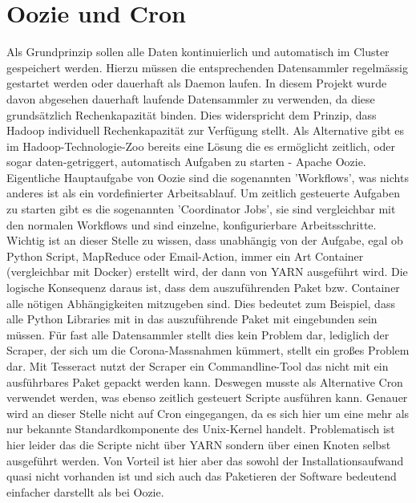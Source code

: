 \documentclass[12pt,oneside,a4paper,parskip]{scrbook}
\begin{document}
\section{Oozie und Cron}  \label{ooziecron}
Als Grundprinzip sollen alle Daten kontinuierlich und automatisch im Cluster gespeichert werden. Hierzu m\"ussen die entsprechenden Datensammler regelm\"assig gestartet werden oder dauerhaft als Daemon laufen. In diesem Projekt wurde davon abgesehen dauerhaft laufende Datensammler zu verwenden, da diese grunds\"atzlich Rechenkapazit\"at binden. Dies widerspricht dem Prinzip, dass Hadoop individuell Rechenkapazit\"at zur Verf\"ugung stellt.\newline
Als Alternative gibt es im Hadoop-Technologie-Zoo bereits eine L\"osung die es erm\"oglicht zeitlich, oder sogar daten-getriggert, automatisch Aufgaben zu starten - Apache Oozie. Eigentliche Hauptaufgabe von Oozie sind die sogenannten 'Workflows', was nichts anderes ist als ein vordefinierter Arbeitsablauf. Um zeitlich gesteuerte Aufgaben zu starten gibt es die sogenannten 'Coordinator Jobs', sie sind vergleichbar mit den normalen Workflows und sind einzelne, konfigurierbare Arbeitsschritte. Wichtig ist an dieser Stelle zu wissen, dass unabh\"angig von der Aufgabe, egal ob Python Script, MapReduce oder Email-Action, immer ein Art Container (vergleichbar mit Docker) erstellt wird, der dann von YARN ausgef\"uhrt wird. \newline
Die logische Konsequenz daraus ist, dass dem auszuf\"uhrenden Paket bzw. Container alle n\"otigen Abh\"angigkeiten mitzugeben sind. Dies bedeutet zum Beispiel, dass alle Python Libraries mit in das auszuf\"uhrende Paket mit eingebunden sein m\"ussen. F\"ur fast alle Datensammler stellt dies kein Problem dar, lediglich der Scraper, der sich um die Corona-Massnahmen k\"ummert, stellt ein großes Problem dar. Mit Tesseract nutzt der Scraper ein Commandline-Tool das nicht mit ein ausf\"uhrbares Paket gepackt werden kann. \newline
Deswegen musste als Alternative Cron verwendet werden, was ebenso zeitlich gesteuert Scripte ausf\"uhren kann. Genauer wird an dieser Stelle nicht auf Cron eingegangen, da es sich hier um eine mehr als nur bekannte Standardkomponente des Unix-Kernel handelt. Problematisch ist hier leider das die Scripte nicht \"uber YARN sondern \"uber einen Knoten selbst ausgef\"uhrt werden. Von Vorteil ist hier aber das sowohl der Installationsaufwand quasi nicht vorhanden ist und sich auch das Paketieren der Software bedeutend einfacher darstellt als bei Oozie.
\end{document}
